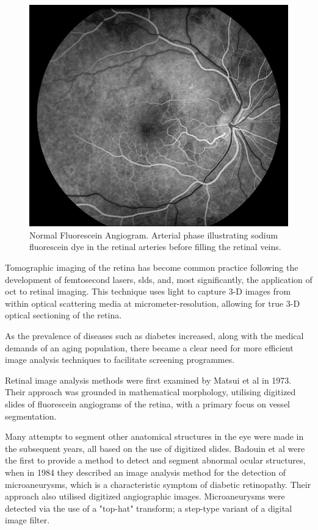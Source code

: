 \begin{figure}[H]
\centering
  \includegraphics{figures/fluore_angio}
\caption{Normal Fluorescein Angiogram. Arterial phase illustrating sodium fluorescein dye in the retinal arteries before filling the retinal veins.\cite{3_medicine.uiowa.edu_2015}}
\label{fig:fluore_angio_image}
\end{figure}

Tomographic imaging of the retina has become common practice following
the development of femtosecond \Gls{laser}s, \Gls{sld}s, and,
most significantly, the application of \Gls{oct}
to retinal imaging.\cite{huang1991optical}  This technique uses light to capture
3-D images from within optical scattering media at micrometer-resolution,
allowing for true 3-D optical sectioning of the retina.\cite{van2007recent}

As the prevalence of diseases such as diabetes increased, along with
the medical demands of an aging population, there became a clear need
for more efficient image analysis techniques to facilitate screening programmes.

Retinal image analysis methods were first examined by Matsui et al in 1973.
Their approach was grounded in mathematical morphology, utilising digitized
slides of fluorescein angiograms of the retina, with a primary focus on vessel segmentation.\cite{matsui1973study}  

Many attempts to segment other anatomical structures in the eye were
 made in the subsequent years, all based on the use of digitized slides.
Badouin et al were the first to provide a method to detect and segment
abnormal ocular structures, when in 1984 they described an image analysis
method for the detection of microaneurysms, which is a characteristic symptom
of diabetic retinopathy.\cite{baudoin1983automatic}  Their approach also
utilised digitized angiographic images.  Microaneurysms were detected
via the use of a "top-hat" transform; a step-type variant of a digital image filter.\cite{sonka1998image}  

